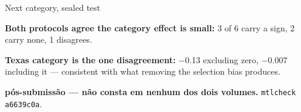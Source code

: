 \documentclass{beamer}
\begin{document}
\begin{frame}[noframenumbering]{Next category, sealed test}
    \smallskip
    {\footnotesize
    \textbf{Both protocols agree the category effect is small:}
    3 of 6 carry a sign, 2 carry none, 1 disagrees.\par
    \smallskip
    \textbf{Texas category is the one disagreement:} $-$0.13 excluding zero, $-$0.007 including it ---
    consistent with what removing the selection bias produces.\par}

    \vfill
    {\scriptsize
    \begin{minipage}[b]{0.80\linewidth}\raggedright\textcolor{black!70}{\textbf{pós-submissão ---
    não consta em nenhum dos dois volumes.} \texttt{mtlcheck} \texttt{a6639c0a}.}\end{minipage}\hfill
    \begin{minipage}[b]{0.15\linewidth}\raggedleft \hyperlink{b0}{}\end{minipage}\par}
\end{frame}
\end{document}
